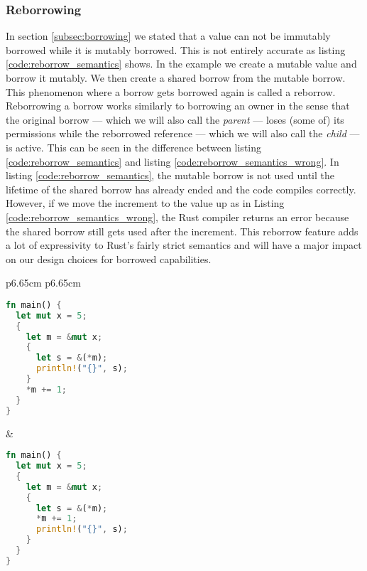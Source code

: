 \subsubsection{Reborrowing}
\label{sec:backgroundreborrow}
In section \ref{subsec:borrowing} we stated that a value can not be immutably borrowed while it is mutably borrowed.
This is not entirely accurate as listing \ref{code:reborrow_semantics} shows.
In the example we create a mutable value and borrow it mutably.
We then create a shared borrow from the mutable borrow.
This phenomenon where a borrow gets borrowed again is called a reborrow.
Reborrowing a borrow works similarly to borrowing an owner in the sense that the original borrow --- which we will also call the \textit{parent} --- loses (some of) its permissions while the reborrowed reference --- which we will also call the \textit{child} --- is active.
This can be seen in the difference between listing \ref{code:reborrow_semantics} and listing \ref{code:reborrow_semantics_wrong}.
In listing \ref{code:reborrow_semantics}, the mutable borrow is not used until the lifetime of the shared borrow has already ended and the code compiles correctly.
However, if we move the increment to the value up as in Listing \ref{code:reborrow_semantics_wrong}, the Rust compiler returns an error because the shared borrow still gets used after the increment.
This reborrow feature adds a lot of expressivity to Rust's fairly strict semantics and will have a major impact on our design choices for borrowed capabilities.

\noindent
\begin{tabular}{p{6.65cm} p{6.65cm}}
    \begin{lstlisting}[language=Rust,frame=single,caption=Reborrow Example,label=code:reborrow_semantics]
fn main() {
  let mut x = 5;
  {
    let m = &mut x;
    {
      let s = &(*m);
      println!("{}", s);
    }
    *m += 1;
  }
}
    \end{lstlisting}

    &

    \begin{lstlisting}[language=Rust,frame=single,caption=Wrong Example,label=code:reborrow_semantics_wrong]
fn main() {
  let mut x = 5;
  {
    let m = &mut x;
    {
      let s = &(*m);
      *m += 1;
      println!("{}", s);
    }
  }
}
    \end{lstlisting}
\end{tabular}

